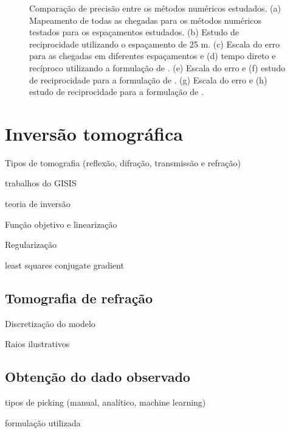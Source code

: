 \begin{figure}[H]
	\caption{Comparação de precisão entre os métodos numéricos estudados. (a) Mapeamento de todas as chegadas para os métodos numéricos testados para os espaçamentos estudados. (b) Estudo de reciprocidade utilizando o espaçamento de 25 m. (c) Escala do erro para as chegadas em diferentes espaçamentos e (d) tempo direto e recíproco utilizando a formulação de . (e) Escala do erro e (f) estudo de reciprocidade para a formulação de . (g) Escala do erro e (h) estudo de reciprocidade para a formulação de .}
	\label{fig:resultsNumericalComparison}
\end{figure}







\section{Inversão tomográfica}

Tipos de tomografia (reflexão, difração, transmissão e refração)







trabalhos do GISIS

\cite{santos2012tomography}
\cite{bulhoes2021efeitos}



teoria de inversão

Função objetivo e linearização

Regularização 

\cite{seo2012nonlinear}
\cite{sain2023active}



least squares conjugate gradient

\cite{saad2003iterative}




\subsection*{Tomografia de refração}

Discretização do modelo

Raios ilustrativos



\subsection*{Obtenção do dado observado}



tipos de picking (manual, analítico, machine learning)

formulação utilizada

\cite{pan2019automatic} 
\cite{qin2021first} 
